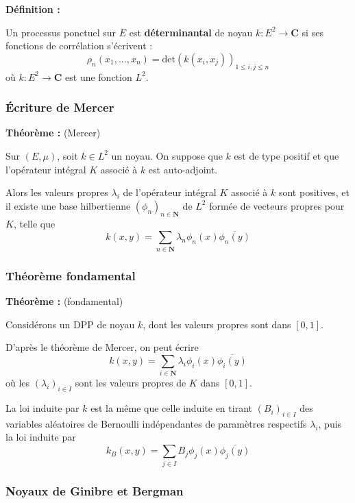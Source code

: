 \documentclass[9pt]{beamer}
\begin{document}
\begin{frame}
    \bigskip

    \textbf{Définition :}

    Un processus ponctuel sur $E$ est \textbf{déterminantal} de noyau $k : E^2 \to \mathbf C$ si ses fonctions de corrélation s'écrivent :
    \[
        \rho_n(x_1,...,x_n) = \mathrm{det}(k(x_i,x_j))_{1 \leqslant i,j \leqslant n}
    \]
    où $ k : E^2 \to \mathbf C $ est une fonction $L^2$.

\end{frame}\begin{frame}\frametitle{Écriture de Mercer}

    \textbf{Théorème :} (Mercer)

    \bigskip

    Sur $ (E, \mu) $, soit $ k \in L^2 $ un noyau. On suppose que $k$ est de type positif et que l'opérateur intégral $K$ associé à $k$ est auto-adjoint.

    \bigskip

    Alors les valeurs propres $ \lambda_i $ de l'opérateur intégral $K$ associé à $k$ sont positives, et il existe une base hilbertienne $(\phi_n)_{n\in\mathbf N}$ de $L^2$ formée de vecteurs propres pour $K$, telle que 
    \[
        k(x,y) = \sum_{n \in \mathbf N} \lambda_n \phi_n(x) \overline{\phi_n(y)} 
    \]

\end{frame}\begin{frame}\frametitle{Théorème fondamental}

    \textbf{Théorème :} (fondamental)

    Considérons un DPP de noyau $k$, dont les valeurs propres sont dans $[0,1]$.

    D'après le théorème de Mercer, on peut écrire 
    \[ 
        k(x,y) = \sum_{i \in \mathbf N} \lambda_i \phi_i (x) \overline{\phi_i(y)}
    \] 
    où les $ (\lambda_i)_{i \in I} $ sont les valeurs propres de $K$ dans $[0,1]$.

    \bigskip

    La loi induite par $k$ est la même que celle induite en tirant $ (B_i)_{i \in I} $ des variables aléatoires de Bernoulli indépendantes de paramètres respectifs $ \lambda_i $, puis la loi induite par 
    \[
         k_B(x,y) = \sum_{j \in I} B_j \phi_j(x) \overline{\phi_j(y)}
    \]

\end{frame}\begin{frame}\frametitle{Noyaux de Ginibre et Bergman}

    \bigskip


\end{frame}
\end{document}
